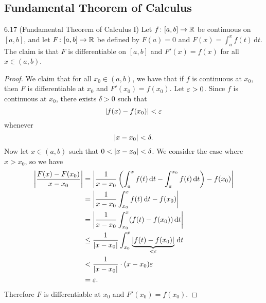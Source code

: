 \documentclass[class=article, crop=false]{standalone}
\begin{document}
  \subsection{Fundamental Theorem of Calculus}
  \begin{theorem}{6.17 (Fundamental Theorem of Calculus I)}
    Let $f\colon [a, b]\to \mathbb{R}$ be continuous on $[a, b]$, and let $F\colon [a, b]\to \mathbb{R}$ be defined by $F(a) = 0$ and $F(x) = \int_{a}^{x}f(t) \,\mathrm dt$. The claim is that $F$ is differentiable on $[a, b]$ and $F'(x) = f(x)$ for all $x\in (a, b)$.
    \begin{proof}
      We claim that for all $x_0\in (a, b)$, we have that if $f$ is continuous at $x_0$, then $F$ is differentiable at $x_0$ and $F'(x_0) = f(x_0)$. Let $\varepsilon > 0$. Since $f$ is continuous at $x_0$, there exists $\delta > 0$ such that
      \[
        \left\lvert f(x) - f(x_0) \right\rvert < \varepsilon
      \]
      whenever
      \[
        \left\lvert x - x_0 \right\rvert < \delta.
      \]
      Now let $x\in (a, b)$ such that $0 < \left\lvert x - x_0 \right\rvert < \delta$. We consider the case where $x > x_0$, so we have
      \begin{align*}
        \left\lvert \frac{F(x) - F(x_0)}{x - x_0} \right\rvert &= \left\lvert \frac{1}{x - x_0}\left( \int_{a}^{x}f(t) \,\mathrm dt - \int_{a}^{x_0}f(t) \,\mathrm dt \right) - f(x_0) \right\rvert \\
                                            &= \left\lvert \frac{1}{x - x_0}\int_{x_0}^{x}f(t) \,\mathrm dt - f(x_0) \right\rvert \\
                                            &= \left\lvert \frac{1}{x - x_0} \int_{x_0}^{x}(f(t) - f(x_0)) \,\mathrm dt \right\rvert \\
                                            &\leq \frac{1}{\left\lvert x - x_0 \right\rvert} \int_{x_0}^{x}\underbrace{\left\lvert f(t) - f(x_0) \right\rvert}_{< \varepsilon} \,\mathrm dt \\
                                            &< \frac{1}{\left\lvert x - x_0 \right\rvert}\cdot (x - x_0)\varepsilon \\
                                            &= \varepsilon.
      \end{align*}
      Therefore $F$ is differentiable at $x_0$ and $F'(x_0) = f(x_0)$.
    \end{proof}
  \end{theorem}
\end{document}
